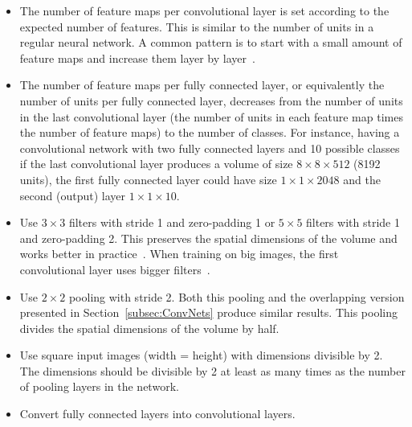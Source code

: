 \begin{itemize}
	\item The number of feature maps per convolutional layer is set according to the expected number of features. This is similar to the number of units in a regular neural network. A common pattern is to start with a small amount of feature maps and increase them layer by layer~\cite{Simonyan2014}. %

	\item The number of feature maps per fully connected layer, or equivalently the number of units per fully connected layer, decreases from the number of units in the last convolutional layer (the number of units in each feature map times the number of feature maps) to the number of classes. For instance, having a convolutional network with two fully connected layers and 10 possible classes if the last convolutional layer produces a volume of size $8 \times 8 \times 512$ (8192 units), the first fully connected layer could have size $1 \times 1 \times 2048$ and the second (output) layer $1\times 1\times 10$.

	\item Use $3\times 3$ filters with stride 1 and zero-padding 1 or $5 \times 5$ filters with stride 1 and zero-padding 2. This preserves the spatial dimensions of the volume and works better in practice~\cite{Springenberg2014}. When training on big images, the first convolutional layer uses bigger filters~\cite{Karpathy2015}.

	
	\item Use $2\times2$ pooling with stride 2. Both this pooling and the overlapping version presented in Section~\ref{subsec:ConvNets} produce similar results. This pooling divides the spatial dimensions of the volume by half.

	\item Use square input images (width = height) with dimensions divisible by 2. The dimensions should be divisible by 2 at least as many times as the number of pooling layers in the network.

	\item Convert fully connected layers into convolutional layers.
\end{itemize}


